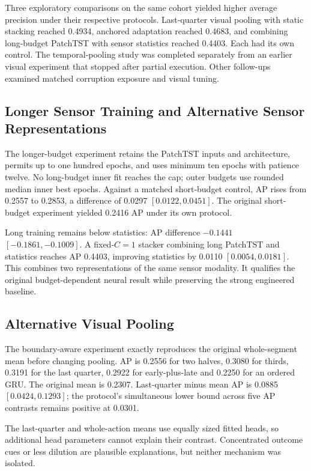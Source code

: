 Three exploratory comparisons on the same cohort yielded higher average precision under
their respective protocols. Last-quarter visual pooling with static stacking reached
0.4934, anchored adaptation reached 0.4683, and combining long-budget PatchTST with
sensor statistics reached 0.4403. Each had its own control. The temporal-pooling study
was completed separately from an earlier visual experiment that stopped after partial
execution. Other follow-ups examined matched corruption exposure and visual
tuning.

\subsection{Longer Sensor Training and Alternative Sensor Representations}
The longer-budget experiment retains the PatchTST inputs and architecture, permits up to
one hundred epochs, and uses minimum ten epochs with patience twelve. No long-budget
inner fit reaches the cap; outer budgets use rounded median inner best epochs. Against a
matched short-budget control, AP rises from 0.2557 to 0.2853, a difference of 0.0297
$[0.0122, 0.0451]$. The original short-budget experiment yielded 0.2416 AP under its own
protocol.

Long training remains below statistics: AP difference $-0.1441$ $[-0.1861, -0.1009]$. A
fixed-$C=1$ stacker combining long PatchTST and statistics reaches AP 0.4403, improving
statistics by 0.0110 $[0.0054, 0.0181]$. This combines two representations of the same
sensor modality. It qualifies the original budget-dependent neural result while
preserving the strong engineered baseline.

\subsection{Alternative Visual Pooling}
The boundary-aware experiment exactly reproduces the original whole-segment mean before
changing pooling. AP is 0.2556 for two halves, 0.3080 for thirds, 0.3191 for the last
quarter, 0.2922 for early-plus-late and 0.2250 for an ordered GRU. The original mean is
0.2307. Last-quarter minus mean AP is 0.0885 $[0.0424, 0.1293]$; the protocol's
simultaneous lower bound across five AP contrasts remains positive at 0.0301.

The last-quarter and whole-action means use equally sized fitted heads, so additional
head parameters cannot explain their contrast. Concentrated outcome cues or less
dilution are plausible explanations, but neither mechanism was isolated.

